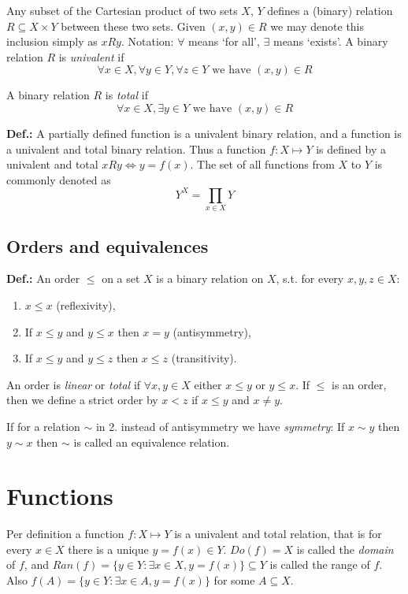 \documentclass{article}
\begin{document}
Any subset of the Cartesian product of two sets $X$, $Y$ defines a (binary) relation $R \subseteq X \times Y $ between these two sets. Given $(x, y) \in R$ we may denote this inclusion simply as $xRy$. 
   Notation: $\forall$ means ‘for all’, $\exists$ means ‘exists’.
A binary relation $R$ is \textit{univalent} if
\[
\forall x \in X, \forall y \in Y, \forall z \in Y \text{ we have } (x, y)\in R
\]

A binary relation $R$ is \textit{total} if
\[
\forall x \in X, \exists y \in Y \text{ we have } (x,y) \in R
\]

\textbf{Def.:} A partially defined function is a univalent binary relation, and a function is a univalent and total binary relation. Thus a function $f: X \mapsto Y$ is defined by a univalent and total $xRy\iff y = f(x)$.
The set of all functions from $X$ to $Y$ is commonly denoted as 
\[
Y^X = \prod_{x\in X}Y
\]

\subsection{Orders and equivalences}

\textbf{Def.:} An order $\leq$ on a set $X$ is a binary relation on $X$, s.t. for every $x, y, z \in X$:
\begin{enumerate}
    \item $x \leq x$ (reflexivity),
    \item If $x \leq y$ and $y \leq x$ then $x=y$ (antisymmetry),
    \item If $x \leq y$ and $y\leq z$ then $x\leq z$ (transitivity).
\end{enumerate}


An order is \textit{linear} or \textit{total} if $\forall x,y\in X$ either $x\leq y$ or $y\leq x$. If $\leq$ is an order, then we define a strict order by $x < z$ if $x\leq y$ and $x\neq y$.

If for a relation $\sim$ in 2. instead of antisymmetry we have \textit{symmetry}: 
If $x\sim y$ then $y\sim x$
then $\sim$ is called an equivalence relation.

\section{Functions}

Per definition a function $f: X\mapsto Y$ is a univalent and total relation, that is for every $x\in X$ there is a unique $y = f(x)\in Y$. $Do(f) = X$ is called the \textit{domain} of $f$, and $Ran(f) = \{y \in Y: \exists x \in X, y = f(x)\}\subseteq Y$ is called the range of $f$. Also $f(A) = \{y\in Y:\exists x\in A, y = f(x)\}$ for some $A\subseteq X$.
\end{document}
